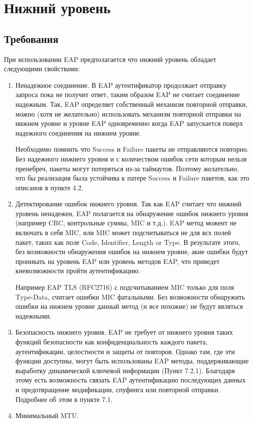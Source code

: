 \section{Нижний уровень}

\subsection{Требования}

При использовании EAP предполагается что нижний уровень обладает следующими свойствами:

\begin{enumerate}
 \item Ненадежное соединение. В EAP аутентификатор продолжает отправку запроса пока не получит ответ, таким образом EAP не считает соединение надежным. Так, EAP определяет собственный механизм повторной отправки, можно (хотя не желательно) использовать механизм повторной отправки на нижнем уровне и уровне EAP одновременно когда EAP запускается поверх надежного соединения на нижнем уровне.

Необходимо помнить что Success и Failure пакеты не отправляются повторно. Без надежного нижнего уровня и с количеством ошибок сети которым нельзя пренебреч, пакеты могут потеряться из-за таймаутов. Поэтому желательно, что бы реализация была устойчива к патере Success и Failure пакетов, как это описанов в пункте 4.2.

 \item Детектирование ошибок нижнего уровня. Так как EAP считает что нижний уровень ненадежен, EAP полагается на обнаружение ошибок нижнего уровня (например CRC, контрольные суммы, MIC и т.д.). EAP метод можент не включать в себя MIC, или MIC может подсчитываться не для всх полей пакет, таких как поле Code, Identifier, Length or Type. В результате этого, без возможности обнаружения ошибок на нижнем уровне, акие ошибки будут проникать на уровень EAP или уровень методов EAP, что приведет кневозможности пройти аутентификацию.

Например EAP TLS (RFC2716) с подсчитыванием MIC только для поля Type-Data, считает ошибки MIC фатальными. Без возможности обнаружить ошибки на нижнем уровне данный метод (и все похожие) не будут являться надежными.

 \item Безопасность нижнего уровня. EAP не требует от нижнего уровня таких функций безопасности как конфиденциальность каждого пакета, аутентификации, целостности и защиты от повторов. Однако там, где эти функции доступны, могут быть использованы EAP методы, поддерживающие выработку динамической ключевой информации (Пункт 7.2.1). Благодаря этому есть возможность связать EAP аутентификацию последующих данных и предотвращение модификации, спуфинга или повторной отправки. Подробнее об этом в пункте 7.1.

 \item Минимальный MTU. 
\end{enumerate}
